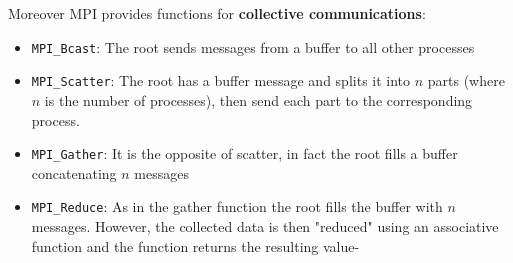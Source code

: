 Moreover MPI provides functions for \textbf{collective communications}:
\begin{itemize}
 \item \texttt{MPI\_Bcast}: The root sends messages from a buffer to all other processes
 \item \texttt{MPI\_Scatter}: The root has a buffer message and splits it into $n$ parts (where $n$ is the number of processes), then send each part to the corresponding process.
 \item \texttt{MPI\_Gather}: It is the opposite of scatter, in fact the root fills a buffer concatenating $n$ messages
 \item \texttt{MPI\_Reduce}: As in the gather function the root fills the buffer with $n$ messages. However, the collected data is then "reduced" using an associative function and the function returns the resulting value-
\end{itemize}


